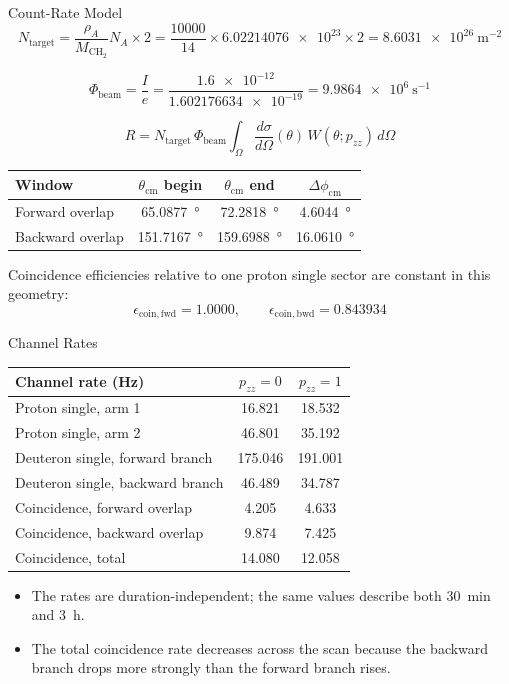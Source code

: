 \documentclass[aspectratio=169]{beamer}
\begin{document}
\begin{frame}{Count-Rate Model}
\small
\[
N_{\mathrm{target}}
=
\frac{\rho_A}{M_{\mathrm{CH_2}}} N_A \times 2
=
\frac{\num{10000}}{14} \times \num{6.02214076e23} \times 2
=
\num{8.6031e26}~\mathrm{m^{-2}}
\]

\[
\Phi_{\mathrm{beam}}
=
\frac{I}{e}
=
\frac{\num{1.6e-12}}{\num{1.602176634e-19}}
=
\num{9.9864e6}~\mathrm{s^{-1}}
\]

\[
R = N_{\mathrm{target}}\,\Phi_{\mathrm{beam}}
\int_{\Omega}
\frac{d\sigma}{d\Omega}(\theta)\,W(\theta; p_{zz})\,d\Omega
\]

\vspace{0.1cm}
\centering
\begin{tabular}{>{\raggedright\arraybackslash}p{3.9cm}ccc}
\toprule
Window & \(\theta_{\mathrm{cm}}\) begin & \(\theta_{\mathrm{cm}}\) end & \(\Delta\phi_{\mathrm{cm}}\) \\
\midrule
Forward overlap & \SI{65.0877}{\degree} & \SI{72.2818}{\degree} & \SI{4.6044}{\degree} \\
Backward overlap & \SI{151.7167}{\degree} & \SI{159.6988}{\degree} & \SI{16.0610}{\degree} \\
\bottomrule
\end{tabular}

\vspace{0.2cm}
\small
Coincidence efficiencies relative to one proton single sector are constant in this geometry:
\[
\epsilon_{\mathrm{coin,fwd}} = 1.0000,
\qquad
\epsilon_{\mathrm{coin,bwd}} = 0.843934
\]
\end{frame}

\begin{frame}{Channel Rates}
\small
\centering
\begin{tabular}{>{\raggedright\arraybackslash}p{4.6cm}cc}
\toprule
Channel rate (Hz) & \(p_{zz}=0\) & \(p_{zz}=1\) \\
\midrule
Proton single, arm 1 & 16.821 & 18.532 \\
Proton single, arm 2 & 46.801 & 35.192 \\
Deuteron single, forward branch & 175.046 & 191.001 \\
Deuteron single, backward branch & 46.489 & 34.787 \\
Coincidence, forward overlap & 4.205 & 4.633 \\
Coincidence, backward overlap & 9.874 & 7.425 \\
Coincidence, total & 14.080 & 12.058 \\
\bottomrule
\end{tabular}

\vspace{0.25cm}
\small
\begin{itemize}
  \item The rates are duration-independent; the same values describe both \SI{30}{min} and \SI{3}{h}.
  \item The total coincidence rate decreases across the scan because the backward branch drops more strongly than the forward branch rises.
\end{itemize}
\end{frame}
\end{document}
